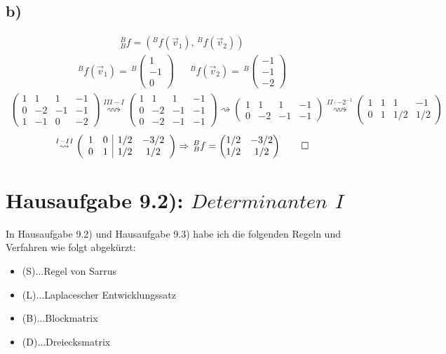 \documentclass[titlepage]{article}
\newcommand{\1}{\mathbb{1}}
\newcommand{\0}{\mathbb{0}}
\newcommand{\vecD}[3]{\left(\begin{smallmatrix}#1\\#2\\#3\end{smallmatrix}\right)}
\newcommand{\matrixZ}[4]{\begin{pmatrix}#1&#2\\#3&#4\end{pmatrix}}
\begin{document}
		\subsection*{b)}
			\begin{align*}
				^B_Bf=(^Bf(\vec{v}_1),\,^Bf(\vec{v}_2))
			\end{align*}
			\begin{align*}
				^Bf(\vec{v}_1)=\,^B\vecD{1}{-1}{0} & &^Bf(\vec{v}_2)=\,^B\vecD{-1}{-1}{-2}
			\end{align*}
			\begin{align*}
				\left(\begin{array}{cc|cc}
					1&1&1&-1\\
					0&-2&-1&-1\\
					1&-1&0&-2
				\end{array}\right)
				\overset{III-I}{\rightsquigarrow}
				\left(\begin{array}{cc|cc}
					1&1&1&-1\\
					0&-2&-1&-1\\
					0&-2&-1&-1
				\end{array}\right)
				\rightsquigarrow
				\left(\begin{array}{cc|cc}
					1&1&1&-1\\
					0&-2&-1&-1
				\end{array}\right)
				\overset{II\cdot-2^{-1}}{\rightsquigarrow}
				\left(\begin{array}{cc|cc}
					1&1&1&-1\\
					0&1&1/2&1/2
				\end{array}\right)	
			\end{align*}
			\begin{align*}
				\overset{I-II}{\rightsquigarrow}
				\left(\begin{array}{cc|cc}
					1&0&1/2&-3/2\\
					0&1&1/2&1/2
				\end{array}\right)
				\Rightarrow
				\,^B_Bf=\matrixZ{1/2}{-3/2}{1/2}{1/2}\qed
			\end{align*}
	\section*{Hausaufgabe 9.2): $Determinanten$ $I$}
	In Hausaufgabe 9.2) und Hausaufgabe 9.3) habe ich die folgenden Regeln und Verfahren wie folgt abgekürzt:
		\begin{itemize}
			\item (S)$\dots$Regel von Sarrus
			\item (L)$\dots$Laplacescher Entwicklungssatz
			\item (B)$\dots$Blockmatrix
			\item (D)$\dots$Dreiecksmatrix
		\end{itemize}
\end{document}
